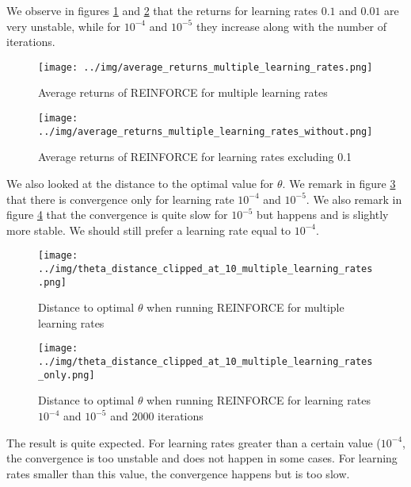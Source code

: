 \documentclass[a4paper]{article}
\begin{document}
We observe in figures \ref{fig:average_returns_multiple_learning_rates} and \ref{fig:average_returns_multiple_learning_rates_without} that the returns for learning rates $0.1$ and $0.01$ are very unstable, while for $10^{-4}$ and $10^{-5}$ they increase along with the number of iterations.

\begin{figure}
\caption{\label{fig:average_returns_multiple_learning_rates} Average returns of REINFORCE for multiple learning rates}
\centering
\texttt{[image: ../img/average\_returns\_multiple\_learning\_rates.png]}
\end{figure}

\begin{figure}
\caption{\label{fig:average_returns_multiple_learning_rates_without} Average returns of REINFORCE for learning rates excluding 0.1}
\centering
\texttt{[image: ../img/average\_returns\_multiple\_learning\_rates\_without.png]}
\end{figure}

We also looked at the distance to the optimal value for $\theta$. We remark in figure
\ref{fig:theta_distance_clipped_at_10_multiple_learning_rates} that there is convergence only for learning rate $10^{-4}$ and $10^{-5}$. We also remark in figure \ref{fig:theta_distance_clipped_at_10_multiple_learning_rates_only} that the convergence is quite slow for $10^{-5}$ but happens and is slightly more stable. We should still prefer a learning rate equal to $10^{-4}$.

\begin{figure}
\caption{\label{fig:theta_distance_clipped_at_10_multiple_learning_rates} Distance to optimal $\theta$ when running REINFORCE for multiple learning rates}
\centering
\texttt{[image: ../img/theta\_distance\_clipped\_at\_10\_multiple\_learning\_rates.png]}
\end{figure}

\begin{figure}
\caption{\label{fig:theta_distance_clipped_at_10_multiple_learning_rates_only} Distance to optimal $\theta$ when running REINFORCE for learning rates $10^{-4}$ and $10^{-5}$ and $2000$ iterations}
\centering
\texttt{[image: ../img/theta\_distance\_clipped\_at\_10\_multiple\_learning\_rates\_only.png]}
\end{figure}

The result is quite expected. For learning rates greater than a certain value ($10^{-4}$, the convergence is too unstable and does not happen in some cases. For learning rates smaller than this value, the convergence happens but is too slow.
\end{document}
